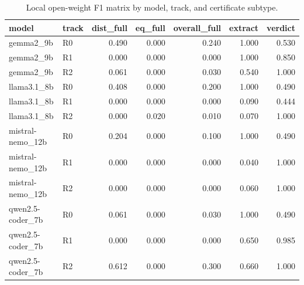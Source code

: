 \begin{table}[t]
\centering
\caption{Local open-weight F1 matrix by model, track, and certificate subtype.}
\label{tab:local-f1}
\begin{tabular}{llrrrrr}
\toprule
model & track & dist\_full & eq\_full & overall\_full & extract & verdict \\
\midrule
gemma2\_9b & R0 & 0.490 & 0.000 & 0.240 & 1.000 & 0.530 \\
gemma2\_9b & R1 & 0.000 & 0.000 & 0.000 & 1.000 & 0.850 \\
gemma2\_9b & R2 & 0.061 & 0.000 & 0.030 & 0.540 & 1.000 \\
llama3.1\_8b & R0 & 0.408 & 0.000 & 0.200 & 1.000 & 0.490 \\
llama3.1\_8b & R1 & 0.000 & 0.000 & 0.000 & 0.090 & 0.444 \\
llama3.1\_8b & R2 & 0.000 & 0.020 & 0.010 & 0.070 & 1.000 \\
mistral-nemo\_12b & R0 & 0.204 & 0.000 & 0.100 & 1.000 & 0.490 \\
mistral-nemo\_12b & R1 & 0.000 & 0.000 & 0.000 & 0.040 & 1.000 \\
mistral-nemo\_12b & R2 & 0.000 & 0.000 & 0.000 & 0.060 & 1.000 \\
qwen2.5-coder\_7b & R0 & 0.061 & 0.000 & 0.030 & 1.000 & 0.490 \\
qwen2.5-coder\_7b & R1 & 0.000 & 0.000 & 0.000 & 0.650 & 0.985 \\
qwen2.5-coder\_7b & R2 & 0.612 & 0.000 & 0.300 & 0.660 & 1.000 \\
\bottomrule
\end{tabular}
\end{table}